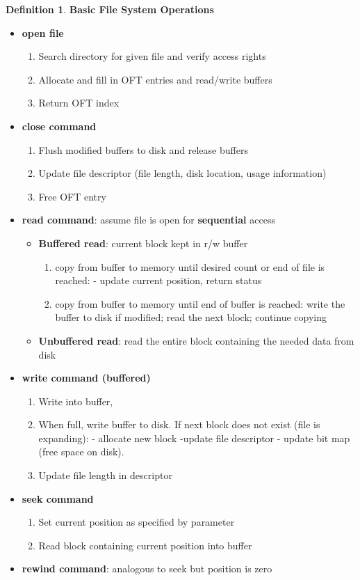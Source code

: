 \documentclass[11pt,a4paper]{article}
\theoremstyle{definition}
\newtheorem{definition}{Definition}[section]
\newenvironment{myitemize}
{ \begin{itemize}
    \setlength{\itemsep}{5pt}
    \setlength{\parskip}{0pt}
    \setlength{\parsep}{0pt}     }
{ \end{itemize}                  }
\newenvironment{myenumerate}
{ \begin{enumerate}
    \setlength{\itemsep}{5pt}
    \setlength{\parskip}{0pt}
    \setlength{\parsep}{0pt}     }
{ \end{enumerate}                }
\begin{document}
\begin{definition}{\textbf{Basic File System Operations}}
	\begin{myitemize}
		\item \textbf{\textsf{open} file}
		\begin{myenumerate}
			\item Search directory for given file and verify access rights
			\item Allocate and fill in OFT entries and read/write buffers
			\item Return OFT index
		\end{myenumerate}
		\item \textbf{\textsf{close} command}
		\begin{myenumerate}
			\item Flush modified buffers to disk and release buffers
			\item Update file descriptor (file length, disk location, usage information)
			\item Free OFT entry
		\end{myenumerate}
		\item \textbf{\textsf{read} command}: assume file is open for \textbf{sequential} access
		\begin{myitemize}
			\item \textbf{Buffered read}: current block kept in r/w buffer
			\begin{myenumerate}
				\item copy from buffer to memory until desired count or end of file is reached: - update current position, return status
				\item copy from buffer to memory until end of buffer is reached: write the buffer to disk if modified; read the next block; continue copying
			\end{myenumerate}
			\item \textbf{Unbuffered read}: read the entire block containing the needed data from disk
		\end{myitemize}
		\item \textbf{\textsf{write} command (buffered)}
		\begin{myenumerate}
			\item Write into buffer,
			\item When full, write buffer to disk. If next block does not exist (file is expanding): - allocate new block -update file descriptor - update bit map (free space on disk).
			\item Update file length in descriptor
		\end{myenumerate}
		\item \textbf{\textsf{seek} command}
		\begin{myenumerate}
			\item Set current position as specified by parameter
			\item Read block containing current position into buffer
		\end{myenumerate}
		\item \textbf{\textsf{rewind} command}: analogous to seek but position is zero
	\end{myitemize}
\end{definition}
	
\end{document}
